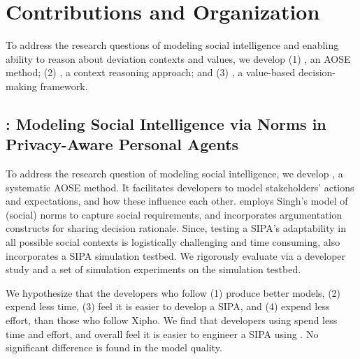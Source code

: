 \section{Contributions and Organization}
\label{sec:intro-contributions}

To address the research questions of modeling social intelligence and
enabling ability to reason about deviation contexts and values, we
develop (1) \frameworkA, an AOSE method; (2) \frameworkB, a context
reasoning approach; and (3) \frameworkAinur, a value-based decision-making framework.

\subsection[Modeling Soical Intelligence via Norms]{\frameworkA: Modeling Social Intelligence via Norms in Privacy-Aware Personal Agents}

To address the research question of modeling social intelligence, we
develop \frameworkA \citep{Ajmeri-AAMAS17-Arnor}, a systematic 
AOSE method. It facilitates developers to model stakeholders' actions
and expectations, and how these influence each other. \frameworkA
employs Singh's  model of (social) norms to
capture social requirements, and incorporates argumentation constructs
\citep{BenchCapon-2007-Argumentation+AI} for sharing decision rationale.
Since, testing a SIPA's adaptability in all possible social contexts is
logistically challenging and time consuming, \frameworkA also
incorporates a SIPA simulation testbed. We rigorously evaluate
\frameworkA via a developer study and a set of simulation experiments on
the simulation testbed. 


We hypothesize that the developers who follow \frameworkA (1) produce
better models, (2) expend less time, (3) feel it is easier to develop a
SIPA, and (4) expend less effort, than those who follow Xipho. We find
that developers using \frameworkA spend less time and effort, and
overall feel it is easier to engineer a SIPA using \frameworkA. No
significant difference is found in the model quality.

